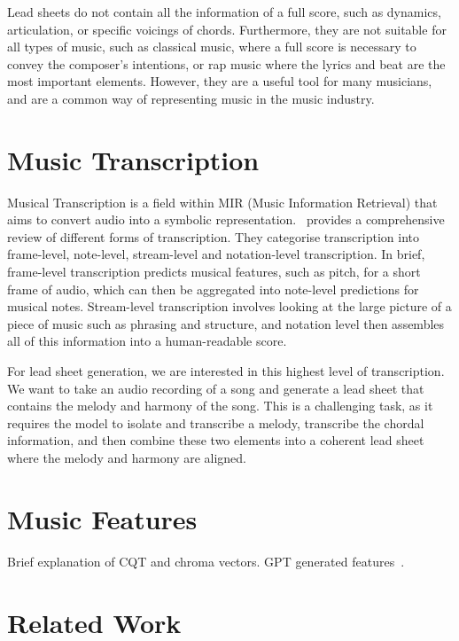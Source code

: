 Lead sheets do not contain all the information of a full score, such as dynamics, articulation, or specific voicings of chords. Furthermore, they are not suitable for all types of music, such as classical music, where a full score is necessary to convey the composer's intentions, or rap music where the lyrics and beat are the most important elements. However, they are a useful tool for many musicians, and are a common way of representing music in the music industry.

\section{Music Transcription}

Musical Transcription is a field within MIR (Music Information Retrieval) that aims to convert audio into a symbolic representation.~\cite{ComprehensiveReviewMusicTranscription} provides a comprehensive review of different forms of transcription. They categorise transcription into frame-level, note-level, stream-level and notation-level transcription. In brief, frame-level transcription predicts musical features, such as pitch, for a short frame of audio, which can then be aggregated into note-level predictions for musical notes. Stream-level transcription involves looking at the large picture of a piece of music such as phrasing and structure, and notation level then assembles all of this information into a human-readable score.

For lead sheet generation, we are interested in this highest level of transcription. We want to take an audio recording of a song and generate a lead sheet that contains the melody and harmony of the song. This is a challenging task, as it requires the model to isolate and transcribe a melody, transcribe the chordal information, and then combine these two elements into a coherent lead sheet where the melody and harmony are aligned.

\section{Music Features}

Brief explanation of CQT and chroma vectors. GPT generated features~\cite{MelodyTranscriptionViaGenerativePreTraining}.

\section{Related Work}

